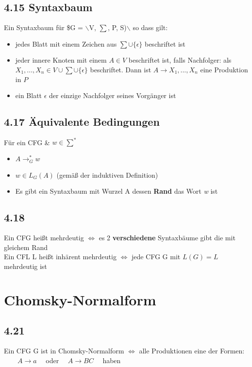 \documentclass[11pt]{article}
\begin{document}
\subsection{4.15 Syntaxbaum}
\label{sec:orge1ee7fe}
Ein Syntaxbaum für \$G = $\backslash${V, \(\sum\), P, S)$\backslash$} so dass gilt:
\begin{itemize}
\item jedes Blatt mit einem Zeichen aus \(\sum \cup \{\epsilon\}\) beschriftet ist
\item jeder innere Knoten mit einem \(A\in V\) beschriftet ist, falls Nachfolger: als \(X_1, ..., X_n \in V\cup \sum \cup \{\epsilon\}\) beschriftet. Dann ist \(A \rightarrow X_1, ..., X_n\) eine Produktion in \(P\)
\item ein Blatt \(\epsilon\) der einzige Nachfolger seines Vorgänger ist
\end{itemize}

\subsection{4.17 Äquivalente Bedingungen}
\label{sec:orgfd7901f}
Für ein CFG \& \(w \in \sum^*\)
\begin{itemize}
\item \(A\rightarrow_G^* w\)
\item \(w\in L_G(A)\) (gemäß der induktiven Definition)
\item Es gibt ein Syntaxbaum mit Wurzel A dessen \textbf{Rand} das Wort \emph{w} ist
\end{itemize}

\subsection{4.18}
\label{sec:org10fb93e}
Ein CFG heißt mehrdeutig \(\iff\) es 2 \textbf{verschiedene} Syntaxbäume gibt die mit gleichem Rand \\
Ein CFL L heißt inhärent mehrdeutig \(\iff\) jede CFG G mit \(L(G) = L\) mehrdeutig ist

\section{Chomsky-Normalform}
\label{sec:org1cdd696}
\subsection{4.21}
\label{sec:org92f7c53}
Ein CFG G ist in Chomsky-Normalform \(\iff\) alle Produktionen eine der Formen:
\(\qquad A \rightarrow a\quad\) oder \(\quad A\rightarrow BC\quad\) haben
\end{document}
